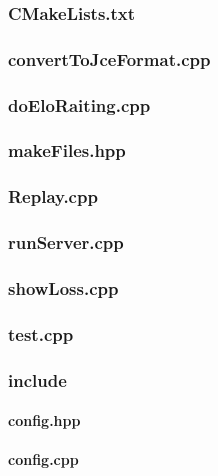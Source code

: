 \documentclass[12pt]{article}
\newcommand{\incFile}[2]{\label{code:#2}\newpage}
\begin{document}
\subsubsection{CMakeLists.txt}										\incFile{python}{AlphaZeroPytorch/CMakeLists.txt}
\subsubsection{convertToJceFormat.cpp}					\incFile{C++}{AlphaZeroPytorch/convertToJceFormat.cpp}
\subsubsection{doEloRaiting.cpp}									\incFile{C++}{AlphaZeroPytorch/doEloRaiting.cpp}
\subsubsection{makeFiles.hpp}										\incFile{C++}{AlphaZeroPytorch/makeFiles.hpp}
\subsubsection{Replay.cpp}											\incFile{C++}{AlphaZeroPytorch/Replay.cpp}
\subsubsection{runServer.cpp}										\incFile{C++}{AlphaZeroPytorch/runServer.cpp}
\subsubsection{showLoss.cpp}										\incFile{C++}{AlphaZeroPytorch/showLoss.cpp}
\subsubsection{test.cpp}												\incFile{C++}{AlphaZeroPytorch/test.cpp}
\subsubsection{include}													%
\paragraph{config.hpp}													\incFile{C++}{AlphaZeroPytorch/include/config.hpp}
\paragraph{config.cpp}													\incFile{C++}{AlphaZeroPytorch/include/config.cpp}
\end{document}
